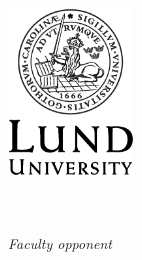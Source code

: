 \frontmatter %

\thispagestyle{empty} %
\begin{center}
\vspace*{5cm}
{\Huge \myMainTitle}
{\LARGE \mySubTitle}
\end{center}


\cleardoublepage
\thispagestyle{empty} %
~

\vfill
\begin{center}
{\Huge \myMainTitle}
\\[2mm]
{\huge \mySubTitle}
\vfill
{\LARGE \myName}

\vfill
\includegraphics[width=0.25\textwidth]{img/LundUniversity_logo.eps}

\vspace{10mm}
{\large \myDegree}\\
\vspace{2mm}
{\large \myDefenceAnnouncement}\\
\vspace{10mm}
{\large\it Faculty opponent}\\
\vspace{5mm}
{\large \myOpponent}\\
{\large \myOpponentAffiliation}
\end{center}
\vfill



